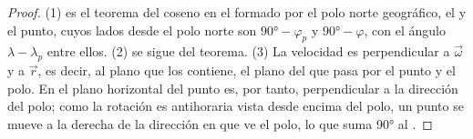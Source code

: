 \begin{proof}
(1) es el teorema del coseno en el  formado por el polo norte geográfico, el  y el punto, cuyos lados
desde el polo norte son $\ang{90} - \varphi_p$ y $\ang{90} - \varphi$, con el ángulo $\lambda - \lambda_p$ entre ellos. (2) se sigue del
teorema. (3) La velocidad es perpendicular a $\vec\omega$ y a $\vec r$, es decir, al plano que los contiene, el plano del 
que pasa por el punto y el polo. En el plano horizontal del punto es, por tanto, perpendicular a la dirección del polo; como la rotación
es antihoraria vista desde encima del polo, un punto se mueve a la derecha de la dirección en que ve el polo, lo que suma \ang{90} al
.
\end{proof}

